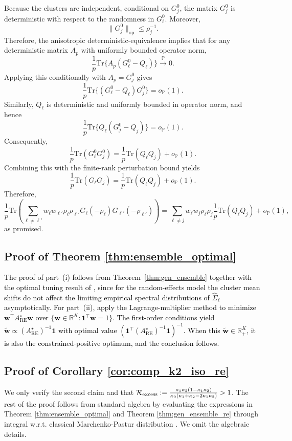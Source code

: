\documentclass{article}
\theoremstyle{plain}
\theoremstyle{remark}
\def \tr {\mathrm{Tr}}
\def \P{\mathbb{P}}
\begin{document}
Because the clusters are independent, conditional on \(G_j^0\), the matrix \(G_j^0\) is deterministic with respect to the randomness in \(G_\ell^0\). Moreover,
\[
\|G_j^0\|_{\mathrm{op}}\leq \rho_j^{-1}.
\]
Therefore, the anisotropic deterministic-equivalence \citep{knowles2017anisotropic} implies that for any deterministic matrix \(A_p\) with uniformly bounded operator norm,
\[
\frac{1}{p}\tr\{A_p(G_\ell^0-Q_\ell)\}
\stackrel{\P}{\to} 0.
\]
Applying this conditionally with \(A_p=G_j^0\) gives
\[
\frac{1}{p}\tr\{(G_\ell^0-Q_\ell)G_j^0\}
=
o_{\P}(1).
\]
Similarly, \(Q_\ell\) is deterministic and uniformly bounded in operator norm, and hence
\[
\frac{1}{p}\tr\{Q_\ell(G_j^0-Q_j)\}
=
o_{\P}(1).
\]
Consequently,
\[
\frac{1}{p}\tr(G_\ell^0G_j^0)
=
\frac{1}{p}\tr(Q_\ell Q_j)
+
o_{\P}(1).
\]
Combining this with the finite-rank perturbation bound yields
\[
\frac{1}{p}\tr(G_\ell G_j)
=
\frac{1}{p}\tr(Q_\ell Q_j)
+
o_{\P}(1).
\]
Therefore,
\[
\frac{1}{p}\tr(\sum_{\ell\neq \ell'} w_{\ell}w_{\ell'}\rho_{\ell}\rho_{\ell'}G_{\ell}(-\rho_{\ell})G_{\ell'}(-\rho_{\ell'}))
=
\sum_{\ell\neq j}
w_\ell w_j\rho_\ell\rho_j
\frac{1}{p}\tr(Q_\ell Q_j)
+
o_{\P}(1),
\]
as promised.

\subsection{Proof of Theorem \ref{thm:ensemble_optimal}}
\textcolor{black}{The proof of part~(i) follows from Theorem~\ref{thm:gen_ensemble} together with the optimal tuning result of \cite{dobriban2018high}, since for the random-effects model the cluster mean shifts do not affect the limiting empirical spectral distributions of $\hat{\Sigma}_{\ell}$ asymptotically. For part~(ii), apply the Lagrange-multiplier method to minimize $\mathbf{w}^\top A^\star_{\mathrm{RE}}\mathbf{w}$ over $\{\mathbf{w}\in\mathbb{R}^K:\mathbf{1}^\top\mathbf{w}=1\}$. The first-order conditions yield $\widetilde{\mathbf{w}}\propto (A^\star_{\mathrm{RE}})^{-1}\mathbf{1}$ with optimal value $(\mathbf{1}^\top(A^\star_{\mathrm{RE}})^{-1}\mathbf{1})^{-1}$. When this $\widetilde{\mathbf{w}}\in\mathbb{R}_+^K$, it is also the constrained-positive optimum, and the conclusion follows.}

\subsection{Proof of Corollary \ref{cor:comp_k2_iso_re}} We only verify the second claim and that $\mathcal{R}_{\rm excess}:=\frac{\kappa_1\kappa_2(1-\kappa_1\kappa_2)}
      {\kappa_0(\kappa_1+\kappa_2-2\kappa_1\kappa_2)}>1$.
The rest of the proof follows from standard algebra by evaluating the expressions in Theorem \ref{thm:ensemble_optimal} and Theorem \ref{thm:gen_ensemble_re} through integral w.r.t. classical Marchenko-Pastur distribution \citep[Section 3.1.1]{bai2010spectral}. We omit the algebraic details.
\end{document}
